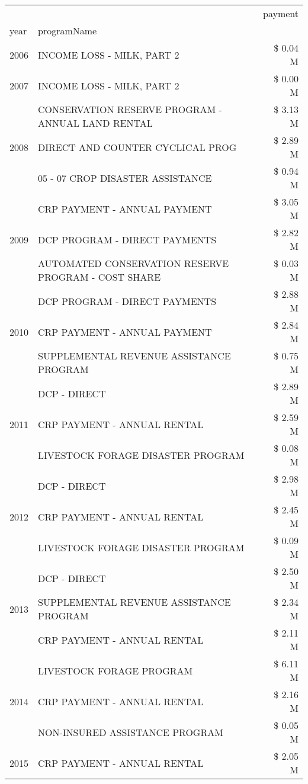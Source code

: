\begin{tabular}{llr}
\toprule
 &  & payment \\
year & programName &  \\
\midrule
2006 & INCOME LOSS - MILK, PART 2 & \$ 0.04 M \\
\cline{1-3}
2007 & INCOME LOSS - MILK, PART 2 & \$ 0.00 M \\
\cline{1-3}
\multirow[t]{3}{*}{2008} & CONSERVATION RESERVE PROGRAM - ANNUAL LAND RENTAL & \$ 3.13 M \\
 & DIRECT AND COUNTER CYCLICAL PROG & \$ 2.89 M \\
 & 05 - 07 CROP DISASTER ASSISTANCE & \$ 0.94 M \\
\cline{1-3}
\multirow[t]{3}{*}{2009} & CRP PAYMENT - ANNUAL PAYMENT & \$ 3.05 M \\
 & DCP PROGRAM - DIRECT PAYMENTS & \$ 2.82 M \\
 & AUTOMATED CONSERVATION RESERVE PROGRAM - COST SHARE & \$ 0.03 M \\
\cline{1-3}
\multirow[t]{3}{*}{2010} & DCP PROGRAM - DIRECT PAYMENTS & \$ 2.88 M \\
 & CRP PAYMENT - ANNUAL PAYMENT & \$ 2.84 M \\
 & SUPPLEMENTAL REVENUE ASSISTANCE PROGRAM & \$ 0.75 M \\
\cline{1-3}
\multirow[t]{3}{*}{2011} & DCP - DIRECT & \$ 2.89 M \\
 & CRP PAYMENT - ANNUAL RENTAL & \$ 2.59 M \\
 & LIVESTOCK FORAGE DISASTER PROGRAM & \$ 0.08 M \\
\cline{1-3}
\multirow[t]{3}{*}{2012} & DCP - DIRECT & \$ 2.98 M \\
 & CRP PAYMENT - ANNUAL RENTAL & \$ 2.45 M \\
 & LIVESTOCK FORAGE DISASTER PROGRAM & \$ 0.09 M \\
\cline{1-3}
\multirow[t]{3}{*}{2013} & DCP - DIRECT & \$ 2.50 M \\
 & SUPPLEMENTAL REVENUE ASSISTANCE PROGRAM & \$ 2.34 M \\
 & CRP PAYMENT - ANNUAL RENTAL & \$ 2.11 M \\
\cline{1-3}
\multirow[t]{3}{*}{2014} & LIVESTOCK FORAGE PROGRAM & \$ 6.11 M \\
 & CRP PAYMENT - ANNUAL RENTAL & \$ 2.16 M \\
 & NON-INSURED ASSISTANCE PROGRAM & \$ 0.05 M \\
\cline{1-3}
\multirow[t]{3}{*}{2015} & CRP PAYMENT - ANNUAL RENTAL & \$ 2.05 M \\

\end{tabular}
